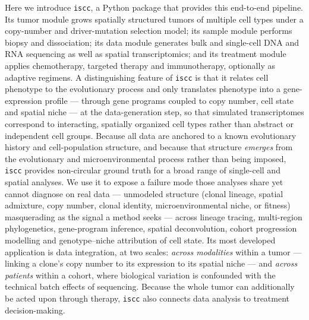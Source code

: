 \documentclass{article}
\begin{document}
Here we introduce \texttt{iscc}, a Python package that provides this end-to-end pipeline. Its
tumor module grows spatially structured tumors of multiple cell types under a copy-number and
driver-mutation selection model; its sample module performs biopsy and dissociation; its data
module generates bulk and single-cell DNA and RNA sequencing as well as spatial
transcriptomics; and its treatment module applies chemotherapy, targeted therapy and
immunotherapy, optionally as adaptive regimens. A distinguishing feature of \texttt{iscc} is
that it relates cell phenotype to the evolutionary process and only translates phenotype into a
gene-expression profile --- through gene programs coupled to copy number, cell state and spatial
niche --- at the data-generation step, so that simulated transcriptomes correspond to interacting,
spatially organized cell types rather than abstract or independent cell groups. Because all data are
anchored to a known evolutionary history and cell-population structure, and because that structure
\emph{emerges} from the evolutionary and microenvironmental process rather than being imposed,
\texttt{iscc} provides non-circular ground truth for a broad range of single-cell and spatial
analyses. We use it to expose a failure mode those analyses share yet cannot diagnose on real data
--- unmodeled structure (clonal lineage, spatial admixture, copy number, clonal identity,
microenvironmental niche, or fitness) masquerading as the signal a method seeks --- across lineage tracing, multi-region
phylogenetics, gene-program inference, spatial deconvolution, cohort progression modelling and
genotype--niche attribution of cell state. Its
most developed application is data integration, at two scales: \emph{across modalities} within a
tumor --- linking a clone's copy number to its expression to its spatial niche --- and \emph{across
patients} within a cohort, where biological variation is confounded with the technical batch effects
of sequencing. Because the whole tumor can additionally be acted upon through therapy, \texttt{iscc}
also connects data analysis to treatment decision-making.
\end{document}
